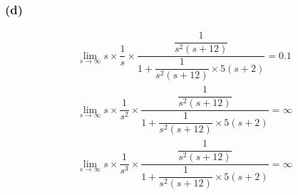 \documentclass[letterpaper,10pt]{article}
\begin{document}
\subsubsection*{(d)}
\begin{align*}
\lim_{s\to\infty}s\times\dfrac{1}{s}\times\dfrac{\dfrac{1}{s^2(s+12)}}{1+\dfrac{1}{s^2(s+12)}\times5(s+2)}=0.1 \\
\lim_{s\to\infty}s\times\dfrac{1}{s^2}\times\dfrac{\dfrac{1}{s^2(s+12)}}{1+\dfrac{1}{s^2(s+12)}\times5(s+2)}=\infty \\
\lim_{s\to\infty}s\times\dfrac{1}{s^3}\times\dfrac{\dfrac{1}{s^2(s+12)}}{1+\dfrac{1}{s^2(s+12)}\times5(s+2)}=\infty
\end{align*}
\end{document}
